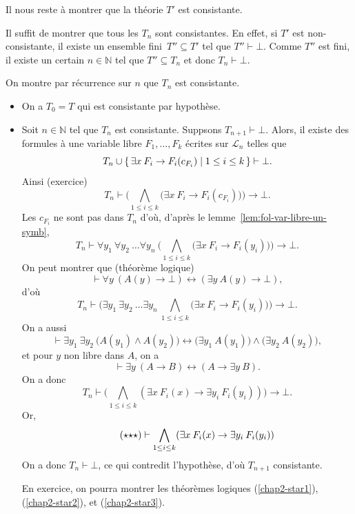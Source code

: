 \documentclass[./main]{subfiles}
\begin{document}
\begin{prv}
    Il nous reste à montrer que la théorie $T'$ est consistante.

    Il suffit de montrer que tous les $T_n$ sont consistantes.
    En effet, si $T'$ est non-consistante, il existe un ensemble fini~$T'' \subseteq T'$ tel que $T'' \vdash \bot$. Comme $T''$ est fini, il existe un certain $n \in \mathds{N}$ tel que $T'' \subseteq T_n$ et donc $T_n \vdash \bot$.

    On montre par récurrence sur $n$ que $T_n$ est consistante.
    \begin{itemize}
      \item On a $T_0 = T$ qui est consistante par hypothèse.
      \item Soit $n \in \mathds{N}$ tel que $T_n$ est consistante. Suppsons $T_{n+1} \vdash \bot$.
        Alors, il existe des formules à une variable libre $F_1, \ldots, F_k$ écrites sur $\mathcal{L}_n$ telles que 
        \[
        T_n \cup \mleft\{\,\exists x \: F_i \to F_i(c_{F_i}) \;\middle|\; 1 \le i \le k\,\mright\} \vdash \bot
        .\]
        Ainsi (exercice) \[
        T_n \vdash \Big( \bigwedge_{1 \le i \le k} \big(\exists x \: F_i \to F_i(c_{F_i})\big) \Big) \to \bot
        .\]
        Les $c_{F_i}$ ne sont pas dans $T_n$ d'où, d'après le lemme~\ref{lem:fol-var-libre-un-symb}, \[
        T_n \vdash \forall y_1 \: \forall y_2 \: \ldots \forall y_n \: \Big( \bigwedge_{1 \le i \le k} \big(\exists x \: F_i \to F_i(y_i)\big) \Big) \to \bot
        .\]
        On peut montrer que (théorème logique)
        \begin{equation}
          \tag{$\star$}
          \label{chap2-star1}
          \vdash \forall y \: (A(y) \to \bot) \leftrightarrow (\exists y \: A(y) \to \bot),
        \end{equation}
        d'où
        \[
        T_n \vdash \Big(\exists y_1 \: \exists y_2 \: \ldots \exists y_n \: \bigwedge_{1 \le i \le k} \big(\exists x \: F_i \to F_i(y_i)\big) \Big) \to \bot
        .\]
        On a aussi
        \begin{equation}
          \tag{$\star\star$}
          \label{chap2-star2}
          \vdash \exists y_1 \: \exists y_2 \: \big( A(y_1) \land A(y_2)\big) \leftrightarrow
          \big(\exists y_1 \: A(y_1)\big) \land \big(\exists y_2 \: A(y_2)\big),
        \end{equation}
        et pour $y$ non libre dans $A$, on a \[
        \vdash \exists y \: (A \to B) \leftrightarrow (A \to \exists y \: B)
        .\]
        On a donc \[
        T_n \vdash \Big( \bigwedge_{1 \le i \le k} (\exists x \: F_i(x) \to \exists y_i \: F_i(y_i)) \Big) \to \bot
        .\]
        Or,
        \begin{equation}
          \tag{$\star{\star}\star$}
          \label{chap2-star3}
          \vdash \bigwedge_{1 \le i \le k} (\exists x \: F_i(x) \to \exists y_i \: F_i(y_i))
        \end{equation}
        On a donc $T_n \vdash \bot$, ce qui contredit l'hypothèse, d'où $T_{n+1}$ consistante.

        En exercice, on pourra montrer les théorèmes logiques (\ref{chap2-star1}), (\ref{chap2-star2}), et (\ref{chap2-star3}).
    \end{itemize}
  \end{prv}
\end{document}
